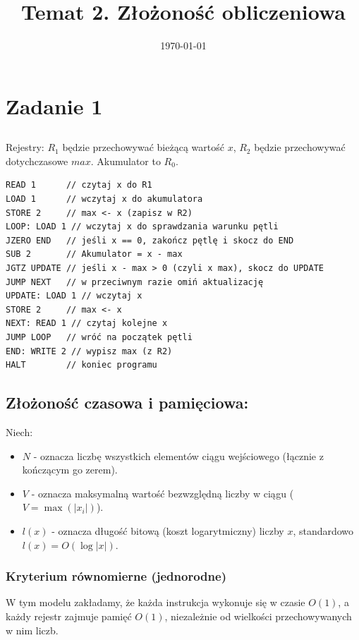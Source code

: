 \documentclass[en, color=black, device=pad, mode=geey]{elegantnote}
\title{Temat 2. Złożoność obliczeniowa }
\author{}
\date{\today}
\begin{document}
\maketitle


\newpage

\section{Zadanie 1}

\subsection{}
Rejestry: $R_1$ będzie przechowywać bieżącą wartość $x$, $R_2$ będzie przechowywać dotychczasowe $max$. Akumulator to $R_0$.


\begin{lstlisting}
READ 1      // czytaj x do R1
LOAD 1      // wczytaj x do akumulatora
STORE 2     // max <- x (zapisz w R2)
LOOP: LOAD 1 // wczytaj x do sprawdzania warunku pętli
JZERO END   // jeśli x == 0, zakończ pętlę i skocz do END
SUB 2       // Akumulator = x - max
JGTZ UPDATE // jeśli x - max > 0 (czyli x max), skocz do UPDATE
JUMP NEXT   // w przeciwnym razie omiń aktualizację
UPDATE: LOAD 1 // wczytaj x
STORE 2     // max <- x
NEXT: READ 1 // czytaj kolejne x
JUMP LOOP   // wróć na początek pętli
END: WRITE 2 // wypisz max (z R2)
HALT        // koniec programu
\end{lstlisting}

\newpage
\subsection{Złożoność czasowa i pamięciowa: }


Niech:
\begin{itemize}
    \item  $N$ - oznacza liczbę wszystkich elementów ciągu wejściowego (łącznie z kończącym go zerem).
    \item $V$ - oznacza maksymalną wartość bezwzględną liczby w ciągu ($V = \max(|x_i|)$).
    \item $l(x)$ - oznacza długość bitową (koszt logarytmiczny) liczby $x$, standardowo $l(x) = O(\log |x|)$.
\end{itemize}

\subsubsection{Kryterium równomierne (jednorodne)}
W tym modelu zakładamy, że każda instrukcja wykonuje się w czasie $O(1)$, a każdy rejestr zajmuje pamięć $O(1)$, niezależnie od wielkości przechowywanych w nim liczb.
\end{document}
